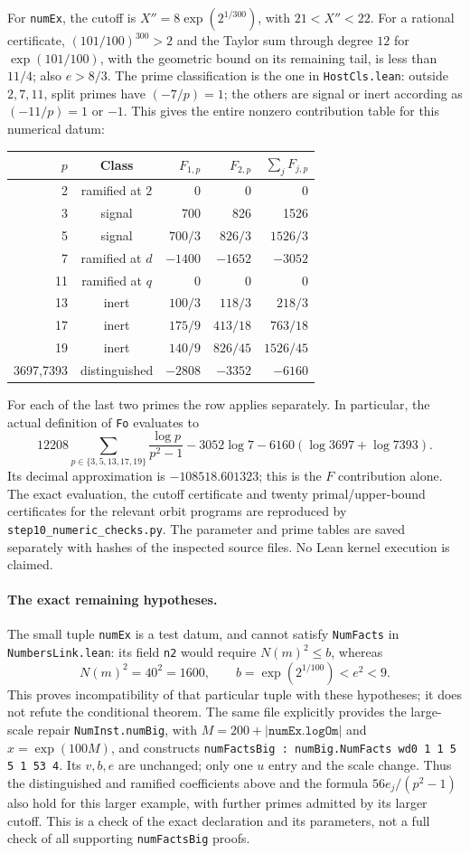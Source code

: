 For \texttt{numEx}, the cutoff is
$X''=8\exp(2^{1/300})$, with $21<X''<22$.
For a rational certificate, $(101/100)^{300}>2$ and the Taylor sum
through degree $12$ for $\exp(101/100)$, with the geometric bound on its
remaining tail, is less than $11/4$; also $e>8/3$.
The prime classification is the one in \texttt{HostCls.lean}:
outside $2,7,11$, split primes have $(-7/p)=1$; the others are signal
or inert according as $(-11/p)=1$ or $-1$.
This gives the entire nonzero contribution table for this numerical datum:
\begin{center}
\begin{tabular}{rcrrr}
\toprule
$p$&Class&$F_{1,p}$&$F_{2,p}$&$\sum_jF_{j,p}$\\
\midrule
2&ramified at $2$&0&0&0\\
3&signal&700&826&1526\\
5&signal&$700/3$&$826/3$&$1526/3$\\
7&ramified at $d$&$-1400$&$-1652$&$-3052$\\
11&ramified at $q$&0&0&0\\
13&inert&$100/3$&$118/3$&$218/3$\\
17&inert&$175/9$&$413/18$&$763/18$\\
19&inert&$140/9$&$826/45$&$1526/45$\\
3697,7393&distinguished&$-2808$&$-3352$&$-6160$\\
\bottomrule
\end{tabular}
\end{center}
For each of the last two primes the row applies separately.  In particular,
the actual definition of \texttt{Fo} evaluates to
\[
 12208\sum_{p\in\{3,5,13,17,19\}}\frac{\log p}{p^2-1}
 -3052\log7-6160(\log3697+\log7393).
\]
Its decimal approximation is $-108518.601323$; this is the $F$
contribution alone.  The exact evaluation, the cutoff certificate and
twenty primal/upper-bound certificates for the relevant orbit programs
are reproduced by \texttt{step10\_numeric\_checks.py}.  The parameter
and prime tables are saved separately with hashes of the inspected source
files.  No Lean kernel execution is claimed.

\paragraph{The exact remaining hypotheses.}
The small tuple \texttt{numEx} is a test datum, and cannot satisfy
\texttt{NumFacts} in \texttt{NumbersLink.lean}: its field \texttt{n2}
would require $N(m)^2\le b$, whereas
\[
 N(m)^2=40^2=1600,\qquad b=\exp(2^{1/100})<e^2<9.
\]
This proves incompatibility of that particular tuple with these hypotheses;
it does not refute the conditional theorem.  The same file explicitly
provides the large-scale repair \texttt{NumInst.numBig}, with
$M=200+|\texttt{numEx.logOm}|$ and $x=\exp(100M)$, and constructs
\texttt{numFactsBig : numBig.NumFacts wd0 1 1 5 5 1 53 4}.
Its $v,b,e$ are unchanged; only one $u$ entry and the scale change.
Thus the distinguished and ramified coefficients above and the formula
$56e_j/(p^2-1)$ also hold for this larger example, with further primes
admitted by its larger cutoff.  This is a check of the exact declaration
and its parameters, not a full check of all supporting \texttt{numFactsBig}
proofs.

